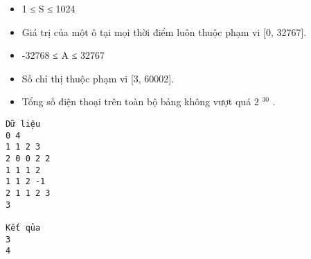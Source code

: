 \begin{itemize}
	\item 1 ≤ S ≤ 1024
	\item Giá trị của một ô tại mọi thời điểm luôn thuộc phạm vi [0, 32767].
	\item -32768 ≤ A ≤ 32767
	\item Số chỉ thị thuộc phạm vi [3, 60002].
	\item Tổng số điện thoại trên toàn bộ bảng không vượt quá 2 $^ 30 $ .
\end{itemize}
\begin{verbatim}
Dữ liệu
0 4  		
1 1 2 3  		
2 0 0 2 2
1 1 1 2
1 1 2 -1
2 1 1 2 3
3

Kết qủa
3
4
\end{verbatim}